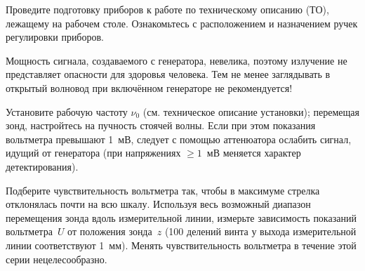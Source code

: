 \begin{lab:task}
    
    
    
    \item Проведите подготовку приборов к работе по техническому описанию (ТО),
    лежащему на рабочем столе. Ознакомьтесь с расположением и назначением
    ручек регулировки приборов.
    
\begin{lab:warning}
Мощность сигнала, создаваемого с генератора, невелика, поэтому
    излучение не представляет опасности для здоровья человека. Тем не менее
    заглядывать в открытый волновод при включённом генераторе не рекомендуется!
\end{lab:warning}
    
    
    
    
    \item Установите рабочую частоту $\nu_0$ (см. техническое описание установки); 
    перемещая зонд, настройтесь на пучность стоячей волны. 
    Если при этом показания вольтметра превышают 1~мВ, 
    следует с помощью аттенюатора ослабить сигнал, идущий от генератора  (при
    напряжениях $\ge1$~мВ меняется характер детектирования).
    
    \item Подберите чувствительность вольтметра так,
    чтобы в максимуме стрелка отклонялась почти на всю шкалу. Используя весь
    возможный диапазон перемещения зонда вдоль измерительной линии, измерьте
    зависимость показаний вольтметра~$U$ от положения зонда~$z$ (100 делений винта
    у выхода измерительной линии соответствуют 1~мм). Менять чувствительность
    вольтметра в течение этой серии нецелесообразно.
    

\end{lab:task}
